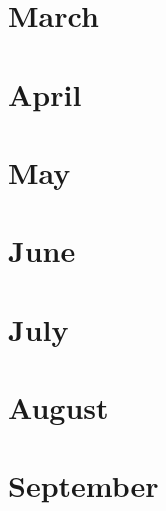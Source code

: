 \documentclass[12pt,letterpaper,oneside]{memoir}
\begin{document}
  \chapter{March}
  
  
  
  
  

  \chapter{April}
  
  
  

  \chapter{May}
  
  
  
  
  
  

  \chapter{June}
  
  
  
  

  \chapter{July}
  
  
  
  

  \chapter{August}
  
  
  

  \chapter{September}
  
  
  
  
  
  
\end{document}
